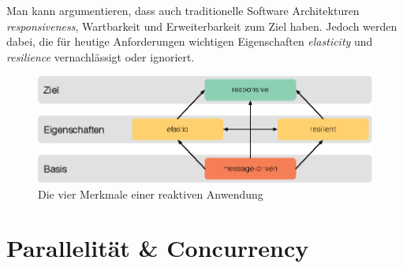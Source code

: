 \pagebreak

Man kann argumentieren, dass auch traditionelle Software Architekturen \textit{responsiveness}, Wartbarkeit und Erweiterbarkeit zum Ziel haben. Jedoch werden dabei, die für heutige Anforderungen wichtigen Eigenschaften \textit{elasticity} und \textit{resilience} vernachlässigt oder ignoriert.

\begin{figure}[H]
 \centering
 \includegraphics[width=1.0\textwidth]{3-Grundlagen/four-traits/four-traits.eps}
 \caption{Die vier Merkmale einer reaktiven Anwendung \cite{kuhn_code_2015}}
 \label{fig:four-traits}
\end{figure}

\pagebreak

\section{Parallelität \& Concurrency}

